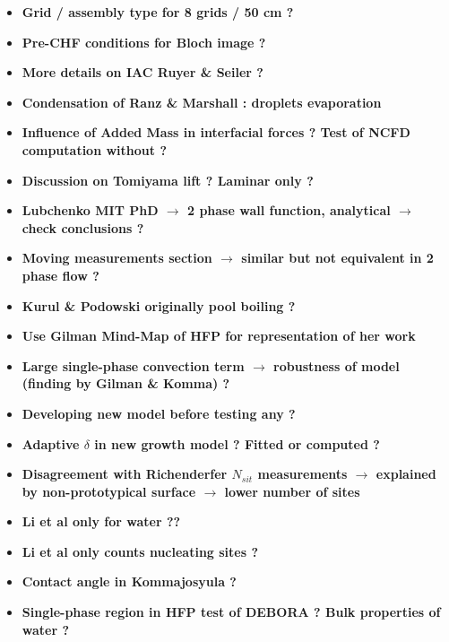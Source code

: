 \documentclass[8pt, a4paper]{article}
\begin{document}
\begin{itemize}
\item \textbf{Grid / assembly type for 8 grids / 50 cm ?}

\item \textbf{Pre-CHF conditions for Bloch image ?}

\item \textbf{More details on IAC Ruyer \& Seiler ?}

\item \textbf{Condensation of Ranz \& Marshall : droplets evaporation}

\item \textbf{Influence of Added Mass in interfacial forces ? Test of NCFD computation without ?}

\item \textbf{Discussion on Tomiyama lift ? Laminar only ?}

\item \textbf{Lubchenko MIT PhD $\rightarrow$ 2 phase wall function, analytical $\rightarrow$ check conclusions ?}

\item \textbf{Moving measurements section $\rightarrow$ similar but not equivalent in 2 phase flow ?}

\item \textbf{Kurul \& Podowski originally pool boiling ?}

\item \textbf{Use Gilman Mind-Map of HFP for representation of her work}

\item \textbf{Large single-phase convection term $\rightarrow$ robustness of model (finding by Gilman \& Komma) ?}

\item \textbf{Developing new model before testing any ?}

\item \textbf{Adaptive $\delta$ in new growth model ? Fitted or computed ?}

\item \textbf{Disagreement with Richenderfer $N_{sit}$ measurements $\rightarrow$ explained by non-prototypical surface $\rightarrow$ lower number of sites}

\item \textbf{Li et al only for water ?? }

\item \textbf{Li et al only counts nucleating sites ?}

\item \textbf{Contact angle in Kommajosyula ?}

\item \textbf{Single-phase region in HFP test of DEBORA ? Bulk properties of water ?}

\end{itemize}
\end{document}
